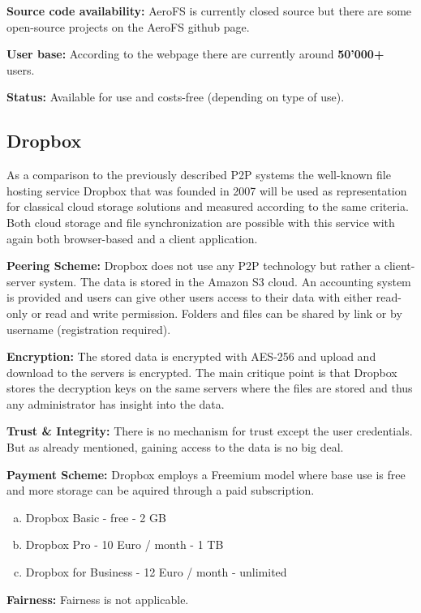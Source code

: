 \textbf{Source code availability:} AeroFS is currently closed source but there are some open-source projects on the AeroFS github page.

\textbf{User base:} According to the webpage \cite{aerofs} there are currently around \textbf{50'000\textsc{+}} users.

\textbf{Status:} Available for use and costs-free (depending on type of use).

\subsection{Dropbox}
\label{subsec:dropbox}
As a comparison to the previously described P2P systems the well-known file hosting service Dropbox that was founded in 2007 will be used as representation for classical cloud storage solutions and measured according to the same criteria. Both cloud storage and file synchronization are possible with this service with again both browser-based and a client application.

\textbf{Peering Scheme:} Dropbox does not use any P2P technology but rather a client-server system. The data is stored in the Amazon S3 cloud. An accounting system is provided and users can give other users access to their data with either read-only or read and write permission. Folders and files can be shared by link or by username (registration required).

\textbf{Encryption:} The stored data is encrypted with AES-256 and upload and download to the servers is encrypted. The main critique point is that Dropbox stores the decryption keys on the same servers where the files are stored and thus any administrator has insight into the data.

\textbf{Trust \& Integrity:} There is no mechanism for trust except the user credentials. But as already mentioned, gaining access to the data is no big deal.

\textbf{Payment Scheme:} Dropbox employs a Freemium model where base use is free and more storage can be aquired through a paid subscription.
\begin{enumerate}[(a)]
	\item Dropbox Basic - free - 2 GB
	\item Dropbox Pro - 10 Euro / month - 1 TB
	\item Dropbox for Business - 12 Euro / month - unlimited
\end{enumerate}

\textbf{Fairness:} Fairness is not applicable.

